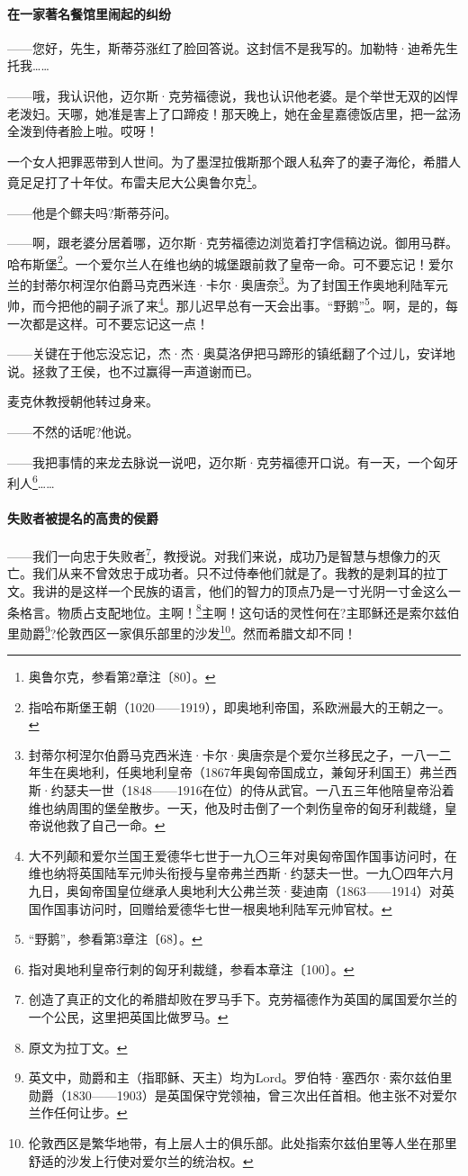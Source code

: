 \paragraph*{在一家著名餐馆里闹起的纠纷}
\par ——您好，先生，斯蒂芬涨红了脸回答说。这封信不是我写的。加勒特·迪希先生托我……
\par ——哦，我认识他，迈尔斯·克劳福德说，我也认识他老婆。是个举世无双的凶悍老泼妇。天哪，她准是害上了口蹄疫！那天晚上，她在金星嘉德饭店里，把一盆汤全泼到侍者脸上啦。哎呀！
\par 一个女人把罪恶带到人世间。为了墨涅拉俄斯那个跟人私奔了的妻子海伦，希腊人竟足足打了十年仗。布雷夫尼大公奥鲁尔克\footnote{奥鲁尔克，参看第2章注〔80〕。}。
\par ——他是个鳏夫吗?斯蒂芬问。
\par ——啊，跟老婆分居着哪，迈尔斯·克劳福德边浏览着打字信稿边说。御用马群。哈布斯堡\footnote{指哈布斯堡王朝（1020——1919），即奥地利帝国，系欧洲最大的王朝之一。}。一个爱尔兰人在维也纳的城堡跟前救了皇帝一命。可不要忘记！爱尔兰的封蒂尔柯涅尔伯爵马克西米连·卡尔·奥唐奈\footnote{封蒂尔柯涅尔伯爵马克西米连·卡尔·奥唐奈是个爱尔兰移民之子，一八一二年生在奥地利，任奥地利皇帝（1867年奥匈帝国成立，兼匈牙利国王）弗兰西斯·约瑟夫一世（1848——1916在位）的侍从武官。一八五三年他陪皇帝沿着维也纳周围的堡垒散步。一天，他及时击倒了一个刺伤皇帝的匈牙利裁缝，皇帝说他救了自己一命。}。为了封国王作奥地利陆军元帅，而今把他的嗣子派了来\footnote{大不列颠和爱尔兰国王爱德华七世于一九〇三年对奥匈帝国作国事访问时，在维也纳将英国陆军元帅头衔授与皇帝弗兰西斯·约瑟夫一世。一九〇四年六月九日，奥匈帝国皇位继承人奥地利大公弗兰茨·斐迪南（1863——1914）对英国作国事访问时，回赠给爱德华七世一根奥地利陆军元帅官杖。}。那儿迟早总有一天会出事。“野鹅”\footnote{“野鹅”，参看第3章注〔68〕。}。啊，是的，每一次都是这样。可不要忘记这一点！
\par ——关键在于他忘没忘记，杰·杰·奥莫洛伊把马蹄形的镇纸翻了个过儿，安详地说。拯救了王侯，也不过赢得一声道谢而已。
\par 麦克休教授朝他转过身来。
\par ——不然的话呢?他说。
\par ——我把事情的来龙去脉说一说吧，迈尔斯·克劳福德开口说。有一天，一个匈牙利人\footnote{指对奥地利皇帝行刺的匈牙利裁缝，参看本章注〔100〕。}……
\paragraph*{失败者被提名的高贵的侯爵}
\par ——我们一向忠于失败者\footnote{创造了真正的文化的希腊却败在罗马手下。克劳福德作为英国的属国爱尔兰的一个公民，这里把英国比做罗马。}，教授说。对我们来说，成功乃是智慧与想像力的灭亡。我们从来不曾效忠于成功者。只不过侍奉他们就是了。我教的是刺耳的拉丁文。我讲的是这样一个民族的语言，他们的智力的顶点乃是一寸光阴一寸金这么一条格言。物质占支配地位。主啊！\footnote{原文为拉丁文。}主啊！这句话的灵性何在?主耶稣还是索尔兹伯里勋爵\footnote{英文中，勋爵和主（指耶稣、天主）均为Lord。罗伯特·塞西尔·索尔兹伯里勋爵（1830——1903）是英国保守党领袖，曾三次出任首相。他主张不对爱尔兰作任何让步。}?伦敦西区一家俱乐部里的沙发\footnote{伦敦西区是繁华地带，有上层人士的俱乐部。此处指索尔兹伯里等人坐在那里舒适的沙发上行使对爱尔兰的统治权。}。然而希腊文却不同！
